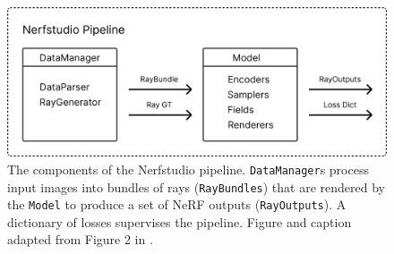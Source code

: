 \begin{figure}[!h]
    \centering
    \includegraphics[width=1.0\textwidth]{figures/nerfstudio-pipeline-components.png}
    \caption[The components of the Nerfstudio pipeline.]{The components of the Nerfstudio pipeline. \texttt{DataManager}s process input images into bundles of rays (\texttt{RayBundles}) that are rendered by the \texttt{Model} to produce a set of NeRF outputs (\texttt{RayOutputs}). A dictionary of losses supervises the pipeline. Figure and caption adapted from Figure 2 in \cite{nerfstudio}.}
    \label{fig:nerfstudio-pipeline-components}
\end{figure}